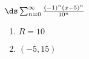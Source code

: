 {$\ds\sum_{n=0}^\infty \frac{(-1)^n(x-5)^{n}}{10^n}$
}
{\begin{enumerate}
	\item $R=10$
	\item	$(-5,15)$
\end{enumerate}
}